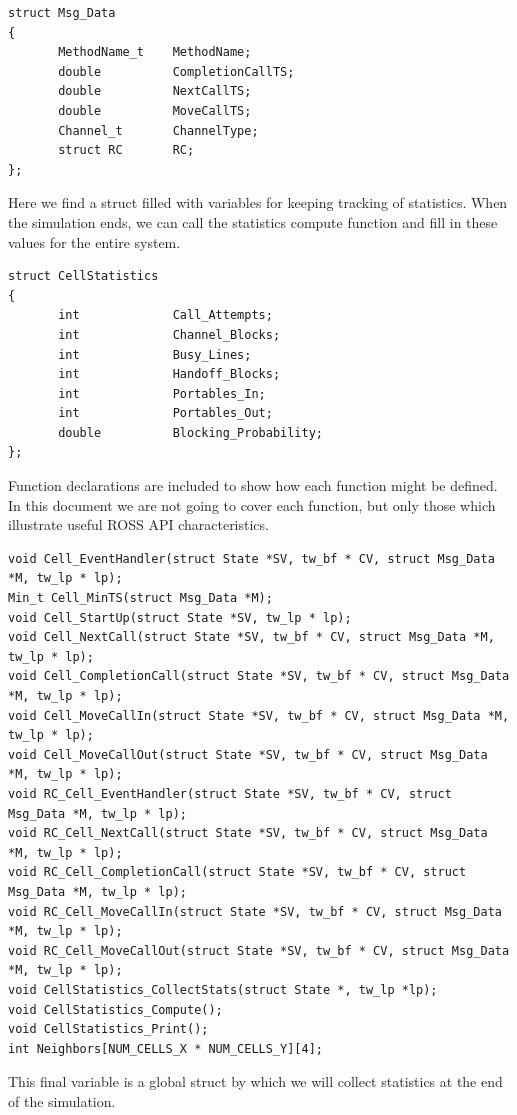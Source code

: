 \documentclass[12pt]{article}
\begin{document}
\begin{verbatim}
struct Msg_Data
{
       MethodName_t    MethodName;
       double          CompletionCallTS;
       double          NextCallTS;
       double          MoveCallTS;
       Channel_t       ChannelType;
       struct RC       RC;
};
\end{verbatim}
 
Here we find a struct filled with variables for keeping tracking of
statistics.  When the simulation ends, we can call the statistics
compute function and fill in these values for the entire system.

\begin{verbatim}
struct CellStatistics
{
       int             Call_Attempts;
       int             Channel_Blocks;
       int             Busy_Lines;
       int             Handoff_Blocks;
       int             Portables_In;
       int             Portables_Out;
       double          Blocking_Probability;
};
\end{verbatim}
 

Function declarations are included to show how each function might be
defined.  In this document we are not going to cover each function,
but only those which illustrate useful ROSS API characteristics.

\begin{verbatim}
void Cell_EventHandler(struct State *SV, tw_bf * CV, struct Msg_Data *M, tw_lp * lp);
Min_t Cell_MinTS(struct Msg_Data *M);
void Cell_StartUp(struct State *SV, tw_lp * lp);
void Cell_NextCall(struct State *SV, tw_bf * CV, struct Msg_Data *M, tw_lp * lp);
void Cell_CompletionCall(struct State *SV, tw_bf * CV, struct Msg_Data *M, tw_lp * lp);
void Cell_MoveCallIn(struct State *SV, tw_bf * CV, struct Msg_Data *M, tw_lp * lp);
void Cell_MoveCallOut(struct State *SV, tw_bf * CV, struct Msg_Data *M, tw_lp * lp);
void RC_Cell_EventHandler(struct State *SV, tw_bf * CV, struct Msg_Data *M, tw_lp * lp);
void RC_Cell_NextCall(struct State *SV, tw_bf * CV, struct Msg_Data *M, tw_lp * lp);
void RC_Cell_CompletionCall(struct State *SV, tw_bf * CV, struct Msg_Data *M, tw_lp * lp);
void RC_Cell_MoveCallIn(struct State *SV, tw_bf * CV, struct Msg_Data *M, tw_lp * lp);
void RC_Cell_MoveCallOut(struct State *SV, tw_bf * CV, struct Msg_Data *M, tw_lp * lp);
void CellStatistics_CollectStats(struct State *, tw_lp *lp);
void CellStatistics_Compute();
void CellStatistics_Print();
int Neighbors[NUM_CELLS_X * NUM_CELLS_Y][4];
\end{verbatim}
 
This final variable is a global struct by which we will collect
statistics at the end of the simulation.
\end{document}

